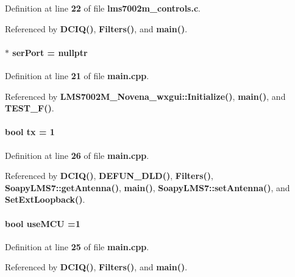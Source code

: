 Definition at line {\bf 22} of file {\bf lms7002m\+\_\+controls.\+c}.



Referenced by {\bf D\+C\+I\+Q()}, {\bf Filters()}, and {\bf main()}.

\paragraph[{ser\+Port}]{$\ast$ ser\+Port = nullptr}\label{mcu__program_2host__src_2main_8cpp_a0d20ae1076940f5f69e66c3c90cb4f98}


Definition at line {\bf 21} of file {\bf main.\+cpp}.



Referenced by {\bf L\+M\+S7002\+M\+\_\+\+Novena\+\_\+wxgui\+::\+Initialize()}, {\bf main()}, and {\bf T\+E\+S\+T\+\_\+\+F()}.

\paragraph[{tx}]{\setlength{\rightskip}{0pt plus 5cm}bool tx = 1\hspace{0.3cm}{\ttfamily [static]}}\label{mcu__program_2host__src_2main_8cpp_a3b1e88519ca75747960d51b86b2c5e95}


Definition at line {\bf 26} of file {\bf main.\+cpp}.



Referenced by {\bf D\+C\+I\+Q()}, {\bf D\+E\+F\+U\+N\+\_\+\+D\+L\+D()}, {\bf Filters()}, {\bf Soapy\+L\+M\+S7\+::get\+Antenna()}, {\bf main()}, {\bf Soapy\+L\+M\+S7\+::set\+Antenna()}, and {\bf Set\+Ext\+Loopback()}.

\paragraph[{use\+M\+CU}]{\setlength{\rightskip}{0pt plus 5cm}bool use\+M\+CU =1\hspace{0.3cm}{\ttfamily [static]}}\label{mcu__program_2host__src_2main_8cpp_ad04f6bbff39cf4031f761f3e5773c452}


Definition at line {\bf 25} of file {\bf main.\+cpp}.



Referenced by {\bf D\+C\+I\+Q()}, {\bf Filters()}, and {\bf main()}.

